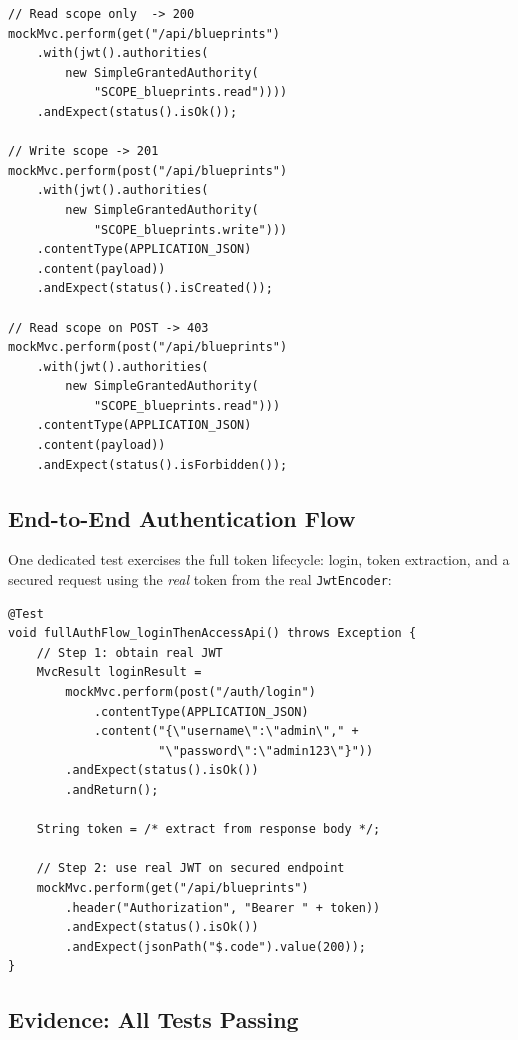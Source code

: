 \documentclass[10pt,a4paper,twocolumn]{article}
\begin{document}
\begin{lstlisting}[style=javacode, caption={JWT mock for scope testing}]
// Read scope only  -> 200
mockMvc.perform(get("/api/blueprints")
    .with(jwt().authorities(
        new SimpleGrantedAuthority(
            "SCOPE_blueprints.read"))))
    .andExpect(status().isOk());

// Write scope -> 201
mockMvc.perform(post("/api/blueprints")
    .with(jwt().authorities(
        new SimpleGrantedAuthority(
            "SCOPE_blueprints.write")))
    .contentType(APPLICATION_JSON)
    .content(payload))
    .andExpect(status().isCreated());

// Read scope on POST -> 403
mockMvc.perform(post("/api/blueprints")
    .with(jwt().authorities(
        new SimpleGrantedAuthority(
            "SCOPE_blueprints.read")))
    .contentType(APPLICATION_JSON)
    .content(payload))
    .andExpect(status().isForbidden());
\end{lstlisting}

\subsection{End-to-End Authentication Flow}

One dedicated test exercises the full token lifecycle: login, token
extraction, and a secured request using the \emph{real} token from the
real \texttt{JwtEncoder}:

\begin{lstlisting}[style=javacode,
    caption={Real login -> real token -> real request test}]
@Test
void fullAuthFlow_loginThenAccessApi() throws Exception {
    // Step 1: obtain real JWT
    MvcResult loginResult =
        mockMvc.perform(post("/auth/login")
            .contentType(APPLICATION_JSON)
            .content("{\"username\":\"admin\"," +
                     "\"password\":\"admin123\"}"))
        .andExpect(status().isOk())
        .andReturn();

    String token = /* extract from response body */;

    // Step 2: use real JWT on secured endpoint
    mockMvc.perform(get("/api/blueprints")
        .header("Authorization", "Bearer " + token))
        .andExpect(status().isOk())
        .andExpect(jsonPath("$.code").value(200));
}
\end{lstlisting}

\subsection{Evidence: All Tests Passing}
\end{document}
